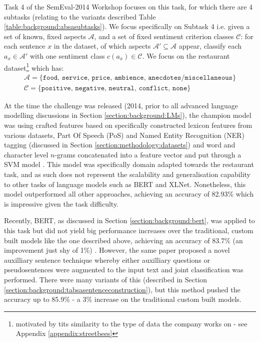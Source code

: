 {{Task 4 of the SemEval-2014 Workshop focuses on this task, for which there are 4 subtasks (relating to the variants described Table \ref{table:background:absasubtasks}).  We focus specifically on Subtask 4 i.e. given a set of known, fixed aspects $\mathcal{A}$, and a set of fixed sentiment criterion classes $\mathcal{C}$: for each sentence $x$ in the dataset, of which aspects $\mathcal{A}' \subseteq \mathcal{A}$ appear, classify each $a_x \in \mathcal{A}'$ with one sentiment class $c(a_x) \in \mathcal{C}$. We focus on the restaurant dataset\footnote{motivated by tits similarity to the type of data the company works on - see Appendix \ref{appendix:streetbees}} which has:
\begin{gather*}
\mathcal{A} = \{ \texttt{food, service, price, ambience, anecdotes/miscellaneous}\} \\
\mathcal{C} = \{ \texttt{positive, negative, neutral, conflict, none}\}
\end{gather*}

At the time the challenge was released (2014, prior to all advanced language modelling discussions in Section \ref{section:background:LMs}), the champion model was using crafted features based on specifically constructed lexicon features from various datasets, Part Of Speech (PoS) and Named Entity Recognition (NER) tagging (discussed in Section \ref{section:methodology:datasets}) and word and character level $n$-grams concatenated into a feature vector and put through a SVM model \cite{Kiritchenko2014}. This model was specifically domain adapted towards the restaurant task, and as such does not represent the scalability and generalisation capability to other tasks of language models such as BERT and XLNet. Nonetheless, this model outperformed all other approaches, achieving an accuracy of 82.93\% which is impressive given the task difficulty.

Recently, BERT, as discussed in Section \ref{section:background:bert}, was applied to this task but did not yield big performance increases over the traditional, custom built models like the one described above, achieving an accuracy of 83.7\% (an improvement just shy of 1\%) \cite{Sun2019}. However, the same paper proposed a novel auxilliary sentence technique whereby either auxilliary questions or pseudosentences were augmented to the input text and joint classification was performed. There were many variants of this (described in Section \ref{section:background:tabsasentenceconstruction}), but this method pushed the accuracy up to 85.9\% - a 3\% increase on the traditional custom built models.
}}
